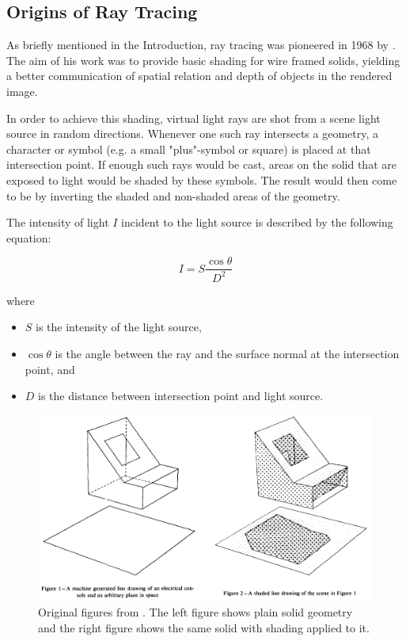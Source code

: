 \subsection{Origins of Ray Tracing}
As briefly mentioned in the Introduction, ray tracing was pioneered in 1968 by \cite{appel1968some}. The aim of his work was to provide basic shading for wire framed solids, yielding a better communication of spatial relation and depth of objects in the rendered image.

In order to achieve this shading, virtual light rays are shot from a scene light source in random directions. Whenever one such ray intersects a geometry, a character or symbol (e.g. a small "plus"-symbol or square) is placed at that intersection point. If enough such rays would be cast, areas on the solid that are exposed to light would be shaded by these symbols.
The result would then come to be by inverting the shaded and non-shaded areas of the geometry.

The intensity of light $I$ incident to the light source is described by the following equation:

\begin{equation}
I = S\frac{\cos{\theta}}{{D}^2}
\end{equation}

\noindent where
\begin{itemize}
	\setlength\itemsep{0.05em}
	\item  $S$ is the intensity of the light source,
	\item  $\cos\theta$ is the angle between the ray and the surface normal at the intersection point, and
	\item  $D$ is the distance between intersection point and light source.
\end{itemize}

\begin{figure}[h]
	\centering
	\includegraphics[width=1\linewidth]{img/1 fundamentals/appel_comp}
	\caption{Original figures from \cite{appel1968some}. The left figure shows plain solid geometry and the right figure shows the same solid with shading applied to it.}
	\label{fig:appel}
\end{figure}

